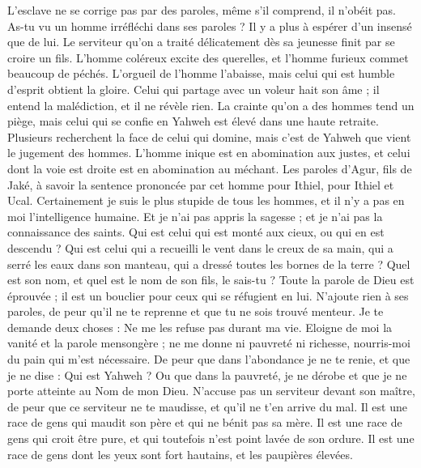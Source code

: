 \begin{multicols}{2}
L'esclave ne se corrige pas par des paroles, même s'il comprend, il n'obéit pas.
As-tu vu un homme irréfléchi dans ses paroles ? Il y a plus à espérer d'un insensé que de lui.
Le serviteur qu'on a traité délicatement dès sa jeunesse finit par se croire un fils.
L'homme coléreux excite des querelles, et l'homme furieux commet beaucoup de péchés.
L'orgueil de l'homme l'abaisse, mais celui qui est humble d'esprit obtient la gloire.
Celui qui partage avec un voleur hait son âme ; il entend la malédiction, et il ne révèle rien.
La crainte qu'on a des hommes tend un piège, mais celui qui se confie en Yahweh est élevé dans une haute retraite.
Plusieurs recherchent la face de celui qui domine, mais c'est de Yahweh que vient le jugement des hommes.
L'homme inique est en abomination aux justes, et celui dont la voie est droite est en abomination au méchant.
\VerseOne{}Les paroles d'Agur, fils de Jaké, à savoir la sentence prononcée par cet homme pour Ithiel, pour Ithiel et Ucal.
Certainement je suis le plus stupide de tous les hommes, et il n'y a pas en moi l'intelligence humaine.
Et je n'ai pas appris la sagesse ; et je n'ai pas la connaissance des saints.
Qui est celui qui est monté aux cieux, ou qui en est descendu ? Qui est celui qui a recueilli le vent dans le creux de sa main, qui a serré les eaux dans son manteau, qui a dressé toutes les bornes de la terre ? Quel est son nom, et quel est le nom de son fils, le sais-tu ?
Toute la parole de Dieu est éprouvée ; il est un bouclier pour ceux qui se réfugient en lui.
N'ajoute rien à ses paroles, de peur qu'il ne te reprenne et que tu ne sois trouvé menteur.
Je te demande deux choses : Ne me les refuse pas durant ma vie.
Eloigne de moi la vanité et la parole mensongère ; ne me donne ni pauvreté ni richesse, nourris-moi du pain qui m'est nécessaire.
De peur que dans l'abondance je ne te renie, et que je ne dise : Qui est Yahweh ? Ou que dans la pauvreté, je ne dérobe et que je ne porte atteinte au Nom de mon Dieu.
N'accuse pas un serviteur devant son maître, de peur que ce serviteur ne te maudisse, et qu'il ne t'en arrive du mal.
Il est une race de gens qui maudit son père et qui ne bénit pas sa mère.
Il est une race de gens qui croit être pure, et qui toutefois n'est point lavée de son ordure.
Il est une race de gens dont les yeux sont fort hautains, et les paupières élevées.

\end{multicols}
